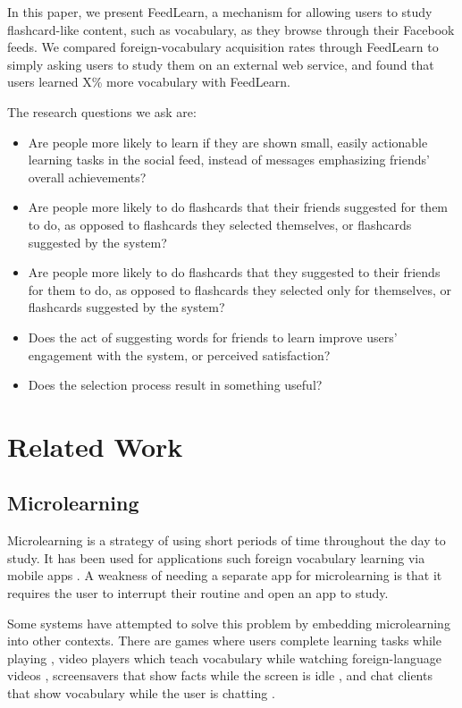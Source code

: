 \documentclass{chi-ext}
\begin{document}
In this paper, we present FeedLearn, a mechanism for allowing users to study flashcard-like content, such as vocabulary, as they browse through their Facebook feeds. We compared foreign-vocabulary acquisition rates through FeedLearn to simply asking users to study them on an external web service, and found that users learned X\% more vocabulary with FeedLearn.

The research questions we ask are:

\begin{itemize}
\item Are people more likely to learn if they are shown small, easily actionable learning tasks in the social feed, instead of messages emphasizing friends' overall achievements?
\item  Are people more likely to do flashcards that their friends suggested for them to do, as opposed to flashcards they selected themselves, or flashcards suggested by the system?
\item  Are people more likely to do flashcards that they suggested to their friends for them to do, as opposed to flashcards they selected only for themselves, or flashcards suggested by the system?
\item Does the act of suggesting words for friends to learn improve users' engagement with the system, or perceived satisfaction?
\item Does the selection process result in something useful?
\end{itemize}

\section{Related Work}

\subsection{Microlearning}

Microlearning is a strategy of using short periods of time throughout the day to study. It has been used for applications such foreign vocabulary learning via mobile apps \cite{microlearning} \cite{micromandarin}. A weakness of needing a separate app for microlearning is that it requires the user to interrupt their routine and open an app to study. %

Some systems have attempted to solve this problem by embedding microlearning into other contexts. There are games where users complete learning tasks while playing \cite{carriearcade}, video players which teach vocabulary while watching foreign-language videos \cite{smartsubtitles}, screensavers that show facts while the screen is idle \cite{screensaver}, and chat clients that show vocabulary while the user is chatting \cite{waitlearning}.
\end{document}

